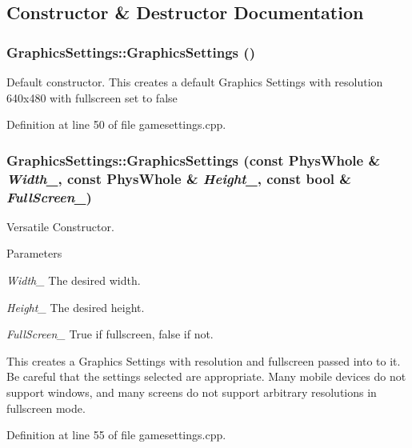 \subsection{Constructor \& Destructor Documentation}
\hypertarget{classGraphicsSettings_a3c5fd3428c4a0549bfa5d5f3b1915c34}{
\subsubsection[{GraphicsSettings}]{\setlength{\rightskip}{0pt plus 5cm}GraphicsSettings::GraphicsSettings ()}}
\label{de/de6/classGraphicsSettings_a3c5fd3428c4a0549bfa5d5f3b1915c34}


Default constructor. This creates a default Graphics Settings with resolution 640x480 with fullscreen set to false 

Definition at line 50 of file gamesettings.cpp.\hypertarget{classGraphicsSettings_ac95d6a9fd22cbf44ad70bd34f8229294}{
\subsubsection[{GraphicsSettings}]{\setlength{\rightskip}{0pt plus 5cm}GraphicsSettings::GraphicsSettings (const PhysWhole \& {\em Width\_\-}, \/  const PhysWhole \& {\em Height\_\-}, \/  const bool \& {\em FullScreen\_\-})}}
\label{de/de6/classGraphicsSettings_ac95d6a9fd22cbf44ad70bd34f8229294}


Versatile Constructor. 
\begin{DoxyParams}{Parameters}
\item[{\em Width\_\-}]The desired width. \item[{\em Height\_\-}]The desired height. \item[{\em FullScreen\_\-}]True if fullscreen, false if not.\end{DoxyParams}
This creates a Graphics Settings with resolution and fullscreen passed into to it. Be careful that the settings selected are appropriate. Many mobile devices do not support windows, and many screens do not support arbitrary resolutions in fullscreen mode. 

Definition at line 55 of file gamesettings.cpp.

